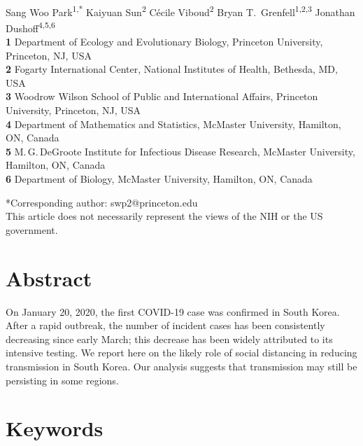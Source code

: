 \begin{flushleft}{
	\Large
	\textbf{}
}
\newline
\\
Sang Woo Park\textsuperscript{1,*}
Kaiyuan Sun\textsuperscript{2}
C\'ecile Viboud\textsuperscript{2}
Bryan T.\ Grenfell\textsuperscript{1,2,3}
Jonathan Dushoff\textsuperscript{4,5,6}
\\
\bigskip
\textbf{1} Department of Ecology and Evolutionary Biology, Princeton University, Princeton, NJ, USA
\\
\textbf{2} Fogarty International Center, National Institutes of Health, Bethesda, MD, USA
\\
\textbf{3} Woodrow Wilson School of Public and International Affairs, Princeton University, Princeton, NJ, USA
\\
\textbf{4} Department of Mathematics and Statistics, McMaster University, Hamilton, ON, Canada
\\
\textbf{5} M.\,G.\,DeGroote Institute for Infectious Disease Research, McMaster University, Hamilton, ON, Canada
\\
\textbf{6} Department of Biology, McMaster University, Hamilton, ON, Canada
\\
\bigskip

*Corresponding author: swp2@princeton.edu\\
This article does not necessarily represent the views of the NIH or the US government.
\end{flushleft}

\section*{Abstract}

On January 20, 2020, the first COVID-19 case was confirmed in South Korea.
After a rapid outbreak, the number of incident cases has been consistently decreasing since early March;
this decrease has been widely attributed to its intensive testing.
We report here on the likely role of social distancing in reducing transmission in South Korea.
Our analysis suggests that transmission may still be persisting in some regions.

\section*{Keywords}

